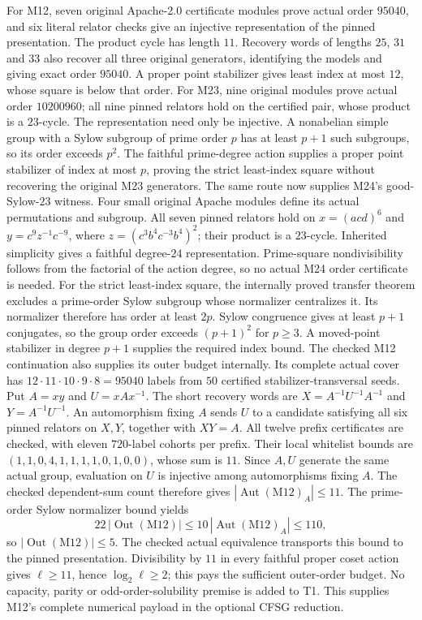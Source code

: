 For M12, seven original Apache-2.0 certificate modules prove actual
order $95040$, and six literal relator checks give an injective
representation of the pinned presentation. The product cycle has
length $11$. Recovery words of lengths $25$, $31$ and $33$ also
recover all three original generators, identifying the models and
giving exact order $95040$. A proper point stabilizer gives least
index at most $12$, whose square is below that order.
For M23, nine original modules prove actual order $10200960$; all nine
pinned relators hold on the certified pair, whose product is a
$23$-cycle. The representation need only be injective. A nonabelian
simple group with a Sylow subgroup of prime order $p$ has at least
$p+1$ such subgroups, so its order exceeds $p^2$. The faithful
prime-degree action supplies a proper point stabilizer of index at
most $p$, proving the strict least-index square without recovering
the original M23 generators.
The same route now supplies M24's good-Sylow-$23$ witness.
Four small original Apache modules define its actual permutations and
subgroup. All seven pinned relators hold on
$x=(acd)^6$ and $y=c^9z^{-1}c^{-9}$, where
$z=(c^3b^4c^{-3}b^4)^2$; their product is a $23$-cycle.
Inherited simplicity gives a faithful degree-$24$ representation.
Prime-square nondivisibility follows from the factorial of the action
degree, so no actual M24 order certificate is needed.
For the strict least-index square, the internally proved transfer
theorem excludes a prime-order Sylow subgroup whose normalizer
centralizes it. Its normalizer therefore has order at least $2p$.
Sylow congruence gives at least $p+1$ conjugates, so the group order
exceeds $(p+1)^2$ for $p\geq3$. A moved-point stabilizer in degree
$p+1$ supplies the required index bound.
The checked M12 continuation also supplies its outer budget internally.
Its complete actual cover has $12\cdot11\cdot10\cdot9\cdot8=95040$
labels from $50$ certified stabilizer-transversal seeds. Put $A=xy$ and
$U=xAx^{-1}$. The short recovery words are
$X=A^{-1}U^{-1}A^{-1}$ and $Y=A^{-1}U^{-1}$.
An automorphism fixing $A$ sends $U$ to a candidate satisfying all six
pinned relators on $X,Y$, together with $XY=A$. All twelve prefix
certificates are checked, with eleven $720$-label cohorts per prefix.
Their local whitelist bounds are
$(1,1,0,4,1,1,1,1,0,1,0,0)$, whose sum is $11$.
Since $A,U$ generate the same actual group, evaluation on $U$ is
injective among automorphisms fixing $A$. The checked dependent-sum
count therefore gives $|\operatorname{Aut}(\mathrm{M12})_A|\leq11$.
The prime-order Sylow normalizer bound yields
\[
 22\,|\operatorname{Out}(\mathrm{M12})|
 \leq10\,|\operatorname{Aut}(\mathrm{M12})_A|\leq110,
\]
so $|\operatorname{Out}(\mathrm{M12})|\leq5$. The checked actual
equivalence transports this bound to the pinned presentation.
Divisibility by $11$ in every faithful proper coset action gives
$\ell\geq11$, hence $\log_2\ell\geq2$; this pays the sufficient
outer-order budget. No capacity, parity or odd-order-solubility premise
is added to T1.
This supplies M12's complete numerical payload in the optional CFSG
reduction.

